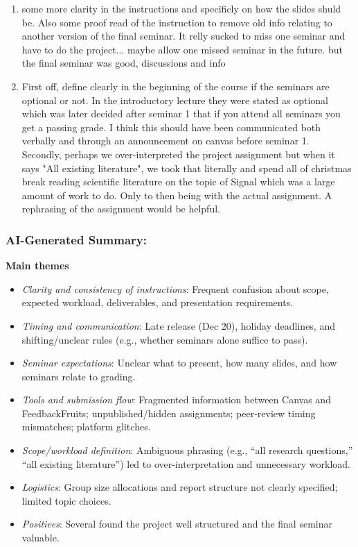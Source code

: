 \documentclass[a4paper]{report}
\begin{document}
\begin{enumerate}
  \item some more clarity in the instructions and specificly on how the slides shuld be. Also some proof read of the instruction to remove old info relating to another version of the final seminar. It relly sucked to miss one seminar and have to do the project... maybe allow one missed seminar in the future. but the final seminar was good, discussions and info
  \item First off, define clearly in the beginning of the course if the seminars are optional or not. In the introductory lecture they were stated as optional which was later decided after seminar 1 that if you attend all seminars you get a passing grade. I think this should have been communicated both verbally and through an announcement on canvas before seminar 1.   Secondly, perhaps we over-interpreted the project assignment but when it says "All existing literature", we took that literally and spend all of christmas break reading scientific literature on the topic of Signal which was a large amount of work to do. Only to then being with the actual assignment. A rephrasing of the assignment would be helpful.
\end{enumerate}

\subsubsection{AI-Generated Summary:}

\textbf{Main themes}
\begin{itemize}
\item \textit{Clarity and consistency of instructions}: Frequent confusion about scope, expected workload, deliverables, and presentation requirements.
\item \textit{Timing and communication}: Late release (Dec 20), holiday deadlines, and shifting/unclear rules (e.g., whether seminars alone suffice to pass).
\item \textit{Seminar expectations}: Unclear what to present, how many slides, and how seminars relate to grading.
\item \textit{Tools and submission flow}: Fragmented information between Canvas and FeedbackFruits; unpublished/hidden assignments; peer-review timing mismatches; platform glitches.
\item \textit{Scope/workload definition}: Ambiguous phrasing (e.g., “all research questions,” “all existing literature”) led to over-interpretation and unnecessary workload.
\item \textit{Logistics}: Group size allocations and report structure not clearly specified; limited topic choices.
\item \textit{Positives}: Several found the project well structured and the final seminar valuable.
\end{itemize}
\end{document}
